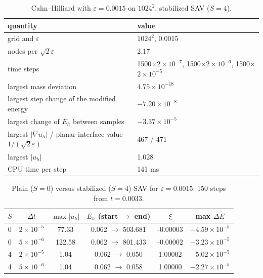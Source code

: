\documentclass[smallextended,envcountsame]{svjour3}
\begin{document}
\begin{table}[t]\centering\footnotesize
\caption{Cahn--Hilliard with $\varepsilon=0.0015$ on $1024^2$, stabilized SAV ($S=4$).}\label{tab:chsharp}
\begin{tabular}{p{}p{}}
\toprule
quantity & value\\
\midrule
grid and $\varepsilon$ & $1024^2$, 0.0015\\
nodes per $\sqrt2\varepsilon$ & 2.17\\
time steps & 1500$\times$$2{\times}10^{-7}$, 1500$\times$$2{\times}10^{-6}$, 1500$\times$$2{\times}10^{-5}$\\
largest mass deviation & $4.75{\times}10^{-18}$\\
largest step change of the modified energy & $-7.20{\times}10^{-8}$\\
largest change of $E_h$ between samples & $-3.37{\times}10^{-5}$\\
largest $|\nabla u_h|$ / planar-interface value $1/(\sqrt2\varepsilon)$ & 467 / 471\\
largest $|u_h|$ & 1.028\\
CPU time per step & 141 ms\\
\bottomrule
\end{tabular}
\end{table}
\begin{table}[t]\centering\footnotesize
\caption{Plain ($S=0$) versus stabilized ($S=4$) SAV for $\varepsilon=0.0015$: 150 steps from $t=0.0033$.}\label{tab:savstab}
\begin{tabular}{cc cccc}
\toprule
$S$ & $\Delta t$ & $\max|u_h|$ & $E_h$ (start $\to$ end) & $\xi$ & max $\Delta\tilde E$\\
\midrule
0 & $2{\times}10^{-5}$ & 77.33 & 0.062 $\to$ 503.681 & -0.00003 & $-4.59{\times}10^{-5}$\\
0 & $5{\times}10^{-6}$ & 122.58 & 0.062 $\to$ 801.433 & -0.00002 & $-3.23{\times}10^{-5}$\\
4 & $2{\times}10^{-5}$ & 1.04 & 0.062 $\to$ 0.050 & 1.00002 & $-5.02{\times}10^{-5}$\\
4 & $5{\times}10^{-6}$ & 1.04 & 0.062 $\to$ 0.058 & 1.00000 & $-2.27{\times}10^{-5}$\\
\bottomrule
\end{tabular}
\end{table}
\end{document}
